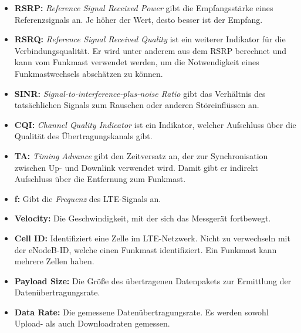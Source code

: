 \begin{itemize}
    \item \textbf{RSRP:} \textit{Reference Signal Received Power} gibt die Empfangsst\"arke eines Referenzsignals an. Je h\"oher der Wert,
        desto besser ist der Empfang.
    \item \textbf{RSRQ:} \textit{Reference Signal Received Quality} ist ein weiterer Indikator f\"ur die Verbindungsqualit\"at.
        Er wird unter anderem aus dem RSRP berechnet und kann vom Funkmast verwendet werden, 
        um die Notwendigkeit eines Funkmastwechsels absch\"atzen zu k\"onnen.
    \item \textbf{SINR:} \textit{Signal-to-interference-plus-noise Ratio} gibt das Verh\"altnis des tats\"achlichen Signals zum Rauschen
        oder anderen St\"oreinfl\"ussen an.
    \item \textbf{CQI:} \textit{Channel Quality Indicator} ist ein Indikator, welcher Aufschluss \"uber die
        Qualit\"at des \"Ubertragungskanals gibt.
    \item \textbf{TA:} \textit{Timing Advance} gibt den Zeitversatz an, der zur Synchronisation zwischen Up- und Downlink
        verwendet wird. Damit gibt er indirekt Aufschluss \"uber die Entfernung zum Funkmast.
    \item \textbf{f:} Gibt die \textit{Frequenz} des LTE-Signals an.
    \item \textbf{Velocity:} Die Geschwindigkeit, mit der sich das Messger\"at fortbewegt.
    \item \textbf{Cell ID:} Identifiziert eine Zelle im LTE-Netzwerk. Nicht zu verwechseln mit der eNodeB-ID, welche einen Funkmast
        identifiziert. Ein Funkmast kann mehrere Zellen haben.
    \item \textbf{Payload Size:} Die Gr\"o{\ss}e des \"ubertragenen Datenpakets zur Ermittlung der Daten\"ubertragungsrate.
    \item \textbf{Data Rate:} Die gemessene Daten\"ubertragungsrate. Es werden sowohl Upload- als auch Downloadraten gemessen.
\end{itemize}

